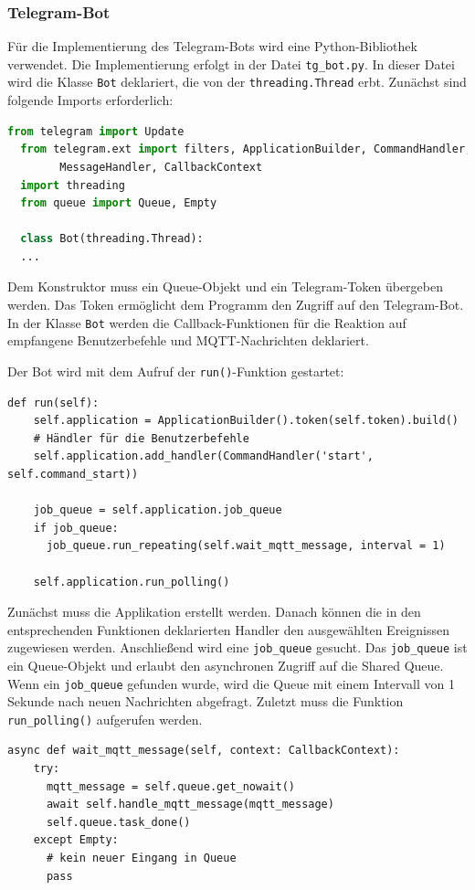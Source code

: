 \documentclass[12pt, letterpaper]{article}
\begin{document}
\subsubsection{Telegram-Bot}
\par Für die Implementierung des Telegram-Bots wird eine Python-Bibliothek verwendet. Die Implementierung erfolgt in der Datei \texttt{tg\_bot.py}. In dieser Datei wird die Klasse \texttt{Bot} deklariert, die von der \texttt{threading.Thread} erbt. Zunächst sind folgende Imports erforderlich:
\begin{lstlisting}[language=python]
  from telegram import Update
  from telegram.ext import filters, ApplicationBuilder, CommandHandler, 
        MessageHandler, CallbackContext
  import threading
  from queue import Queue, Empty

  class Bot(threading.Thread):
  ...
\end{lstlisting}
\par Dem Konstruktor muss ein Queue-Objekt und ein Telegram-Token übergeben werden. Das Token ermöglicht dem Programm den Zugriff auf den Telegram-Bot. In der Klasse \texttt{Bot} werden die Callback-Funktionen für die Reaktion auf empfangene Benutzerbefehle und MQTT-Nachrichten deklariert.
\par Der Bot wird mit dem Aufruf der \texttt{run()}-Funktion gestartet:
\begin{Verbatim}[frame=single]
  def run(self):
    self.application = ApplicationBuilder().token(self.token).build()
    # Händler für die Benutzerbefehle
    self.application.add_handler(CommandHandler('start', self.command_start))
    
    job_queue = self.application.job_queue
    if job_queue:
      job_queue.run_repeating(self.wait_mqtt_message, interval = 1)

    self.application.run_polling()
\end{Verbatim}
\par Zunächst muss die Applikation erstellt werden. Danach können die in den entsprechenden Funktionen deklarierten Handler den ausgewählten Ereignissen zugewiesen werden. Anschließend wird eine \texttt{job\_queue} gesucht. Das \texttt{job\_queue} ist ein Queue-Objekt und erlaubt den asynchronen Zugriff auf die Shared Queue. Wenn ein \texttt{job\_queue} gefunden wurde, wird die Queue mit einem Intervall von 1 Sekunde nach neuen Nachrichten abgefragt. Zuletzt muss die Funktion \texttt{run\_polling()} aufgerufen werden.
\begin{Verbatim}[frame=single]
  async def wait_mqtt_message(self, context: CallbackContext):
    try:
      mqtt_message = self.queue.get_nowait()
      await self.handle_mqtt_message(mqtt_message)
      self.queue.task_done()
    except Empty:
      # kein neuer Eingang in Queue
      pass
\end{Verbatim}
\end{document}
